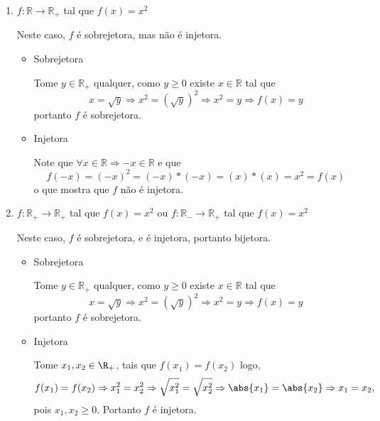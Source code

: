 \begin{exem}
\begin{enumerate}
  \item $f: \mathbb{R} \rightarrow \mathbb{R_{+}}$ tal que $f(x) = x^2$

  Neste caso, $f$ é sobrejetora, mas não é injetora.

  \begin{dem}
   \begin{itemize}
    \item Sobrejetora

    Tome $y \in \mathbb{R_{+}}$ qualquer, como $y \geq 0$ existe $x \in \mathbb{R}$ tal que
\begin{equation}
x = \sqrt{y} \Rightarrow x^2 = (\sqrt{y})^2 \Rightarrow x^2 = y \Rightarrow f(x) = y 
\end{equation}
    portanto $f$ é sobrejetora.
    \fim
    \item Injetora

    Note que $ \forall x \in \mathbb{R} \Rightarrow -x \in \mathbb{R}$ e que
\begin{equation}
f(-x)= (-x)^2 = (-x)*(-x) = (x)*(x) = x^2 = f(x)
\end{equation}
    o que mostra que $f$ não é injetora.

   \end{itemize}
  \end{dem}

  \item $f: \mathbb{R_{+}} \rightarrow \mathbb{R_{+}}$ tal que $f(x) = x^2$ ou $f: \mathbb{R_{-}} \rightarrow \mathbb{R_{+}}$ tal que $f(x) = x^2$

  Neste caso, $f$ é sobrejetora, e é injetora, portanto bijetora.

  \begin{dem}
   \begin{itemize}
    \item Sobrejetora

    Tome $y \in \mathbb{R_{+}}$ qualquer, como $y \geq 0$ existe $x \in \mathbb{R}$ tal que
\begin{equation}
x = \sqrt{y} \Rightarrow x^2 = (\sqrt{y})^2 \Rightarrow x^2 = y \Rightarrow f(x) = y
\end{equation}
    portanto $f$ é sobrejetora.
    \fim
    \item Injetora

    Tome $x_1, x_2 \in \R_{+}$, tais que $f(x_1) = f(x_2)$ logo,
\begin{equation}
f(x_1) = f(x_2) \Rightarrow x_1^2= x_2^2 \Rightarrow \sqrt{x_1^2}= \sqrt{x_2^2} \Rightarrow \abs{x_1}= \abs{x_2} \Rightarrow x_1= x_2, 
\end{equation}
    pois $x_1, x_2 \geqslant 0$. Portanto $f$ é injetora.

   \end{itemize}
  \end{dem}

 \end{enumerate}

\end{exem}


